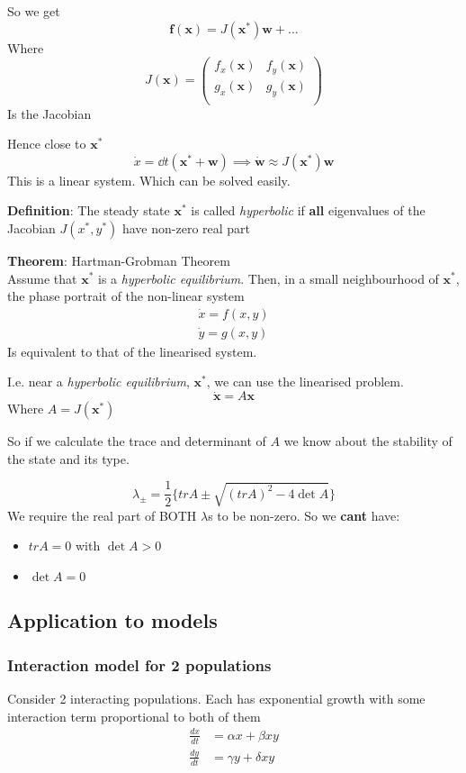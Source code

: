 \documentclass{X:/Documents/Coding/Latex/myassignment}
\begin{document}
So we get
\[\mathbf{f}(\mathbf{x}) = J(\mathbf{x}^*)\mathbf{w} + \ldots\]
Where 
\[J(\mathbf{x}) = \begin{pmatrix}
    f_x(\mathbf{x})&f_y(\mathbf{x})\\
    g_x(\mathbf{x})&g_y(\mathbf{x})\\
\end{pmatrix}\]
Is the Jacobian

Hence close to $\mathbf{x}^*$
\[\dot x = \dd{}t(\mathbf{x}^* + \mathbf{w}) \implies \dot{\mathbf{w}} \approx J(\mathbf{x}^*)\mathbf{w}\]
This is a linear system. Which can be solved easily.


\textbf{Definition}:
The steady state $\mathbf{x}^*$ is called \textit{hyperbolic} if \textbf{all} eigenvalues of the Jacobian $J(x^*,y^*)$ have non-zero real part

\textbf{Theorem}: Hartman-Grobman Theorem\\
Assume that $\mathbf{x}^*$ is a \textit{hyperbolic equilibrium}. Then, in a small neighbourhood of $\mathbf{x}^*$, the phase portrait of the non-linear system
\begin{align*}
    \dot x = f(x,y)\\
    \dot y = g(x,y)
\end{align*}
Is equivalent to that of the linearised system.

I.e. near a \textit{hyperbolic equilibrium}, $\mathbf{x^*}$, we can use the linearised problem.
\[\dot{\mathbf{x}} = A \mathbf{x} \]
Where $A = J(\mathbf{x}^*)$

So if we calculate the trace and determinant of $A$ we know about the stability of the state and its type.

\[\lambda_\pm = \frac12 \{tr A \pm \sqrt{(tr A)^2 - 4\det A}\} \]
We require the real part of BOTH $\lambda$s to be non-zero. 
So we \textbf{cant} have:
\begin{itemize}
    \item  $tr A = 0$  with $\det A >0$
    \item $\det A = 0$ 
\end{itemize}


\subsection{Application to models}
\subsubsection{Interaction model for 2 populations}
Consider 2 interacting populations. Each has exponential growth with some interaction term proportional to both of them
\begin{align*}
    \frac{dx}{dt} &= \alpha x + \beta xy\\
    \frac{dy}{dt} &= \gamma y + \delta xy
\end{align*}
\end{document}
